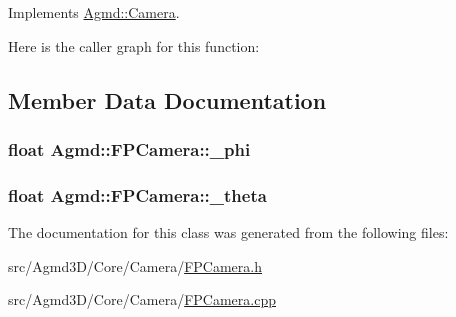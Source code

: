 Implements \hyperlink{class_agmd_1_1_camera_ae4a8331a5f97dd09708fa5096b21eaf0}{Agmd\+::\+Camera}.



Here is the caller graph for this function\+:




\subsection{Member Data Documentation}
\hypertarget{class_agmd_1_1_f_p_camera_af41b36e11f74f14cf85e2cd8f56af913}{
\subsubsection[{\+\_\+phi}]{\setlength{\rightskip}{0pt plus 5cm}float Agmd\+::\+F\+P\+Camera\+::\+\_\+phi\hspace{0.3cm}{\ttfamily [protected]}}}\label{class_agmd_1_1_f_p_camera_af41b36e11f74f14cf85e2cd8f56af913}
\hypertarget{class_agmd_1_1_f_p_camera_a90ff4b852f05fc2136d29987f52689be}{
\subsubsection[{\+\_\+theta}]{\setlength{\rightskip}{0pt plus 5cm}float Agmd\+::\+F\+P\+Camera\+::\+\_\+theta\hspace{0.3cm}{\ttfamily [protected]}}}\label{class_agmd_1_1_f_p_camera_a90ff4b852f05fc2136d29987f52689be}


The documentation for this class was generated from the following files\+:\begin{DoxyCompactItemize}
\item 
src/\+Agmd3\+D/\+Core/\+Camera/\hyperlink{_f_p_camera_8h}{F\+P\+Camera.\+h}\item 
src/\+Agmd3\+D/\+Core/\+Camera/\hyperlink{_f_p_camera_8cpp}{F\+P\+Camera.\+cpp}\end{DoxyCompactItemize}
